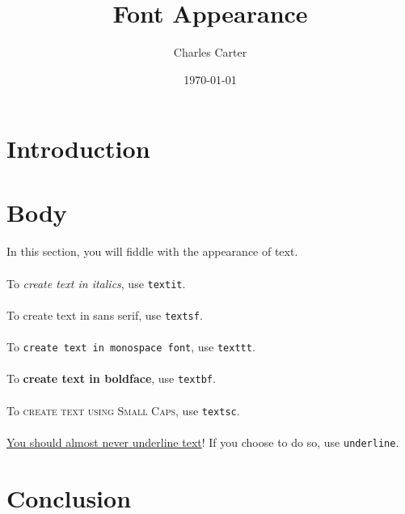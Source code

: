 \documentclass{article}
\title{Font Appearance}
\author{Charles Carter}
\date{\today{}}
\begin{document}
 
    \maketitle{}
    \section{Introduction}
    \label{Introduction}
    \section{Body}
    \label{Body}
        \paragraph{}In this section, you will fiddle with the appearance of text. 
        \paragraph{}To \textit{create text in italics}, use \texttt{textit}. 
        \paragraph{}To \textsf{create text in sans serif}, use \texttt{textsf}. 
        \paragraph{}To \texttt{create text in monospace font}, use \texttt{texttt}. 
        \paragraph{}To \textbf{create text in boldface}, use \texttt{textbf}. 
        \paragraph{}To \textsc{create text using Small Caps}, use \texttt{textsc}. 
        \paragraph{}\underline{You should almost never underline text}! 
        If you choose to do so, use \texttt{underline}.
    \section{Conclusion}
    \label{Conclusion}
\end{document}
